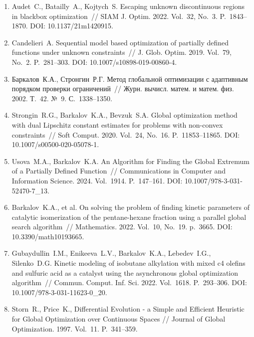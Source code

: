 \documentclass[a4paper,12pt,russian]{article}
\begin{document}
\begin{enumerate}
\item \label{rfa:rulit:Audet2022}
Audet~C., Batailly~A., Kojtych~S. Escaping unknown discontinuous regions in blackbox optimization~// SIAM J. Optim. 2022. Vol.~32, No.~3. P.~1843--1870. DOI: 10.1137/21m1420915.

\item \label{rfa:rulit:Candelieri2019}
Candelieri~A. Sequential model based optimization of partially defined functions
under unknown constraints~// J. Glob. Optim. 2019. Vol.~79, No.~2. P.~281--303. DOI: 10.1007/s10898-019-00860-4.

\item \label{rfa:rulit:Sergeyev2003}
Баркалов~К.А., Стронгин~Р.Г. Метод глобальной оптимизации с адаптивным порядком проверки ограничений~// Журн. вычисл. матем. и матем. физ. 2002. Т.~42. №~9. С.~1338--1350.

\item \label{rfa:rulit:Strongin2020}
Strongin~R.G., Barkalov~K.A., Bevzuk~S.A. Global optimization method with dual Lipschitz constant estimates for problems with non-convex constraints~//
Soft Comput. 2020. Vol.~24, No.~16. P.~11853--11865. DOI: 10.1007/s00500-020-05078-1.

\item \label{rfa:rulit:Usova2024}
Usova~M.A., Barkalov~K.A. An Algorithm for Finding the Global Extremum of a Partially Defined Function~//
Communications in Computer and Information Science. 2024. Vol.~1914. P.~147--161. DOI: 10.1007/978-3-031-52470-7{\_}13.

\item \label{rfa:rulit:Barkalov2022}
Barkalov~K.A., et al. On solving the problem of finding kinetic parameters of catalytic isomerization of the pentane-hexane fraction using a parallel global search algorithm~// 
Mathematics. 2022. Vol.~10, No.~19. p.~3665. DOI: 10.3390/math10193665.

\item \label{rfa:rulit:Gubaydullin2022}
Gubaydullin~I.M., Enikeeva~L.V., Barkalov~K.A., Lebedev~I.G., Silenko~D.G. Kinetic modeling of isobutane alkylation with mixed c4 olefins and sulfuric acid as a catalyst using the asynchronous global optimization algorithm~//
Commun. Comput. Inf. Sci. 2022. Vol.~1618. P.~293--306. DOI: 10.1007/978-3-031-11623-0{\_}20.

\item \label{rfa:rulit:differential_evolution}
Storn~R., Price~K., Differential Evolution - a Simple and Efficient Heuristic for Global Optimization over Continuous Spaces //
Journal of Global Optimization. 1997. Vol.~11. P.~341--359.


\end{enumerate}
\end{document}
